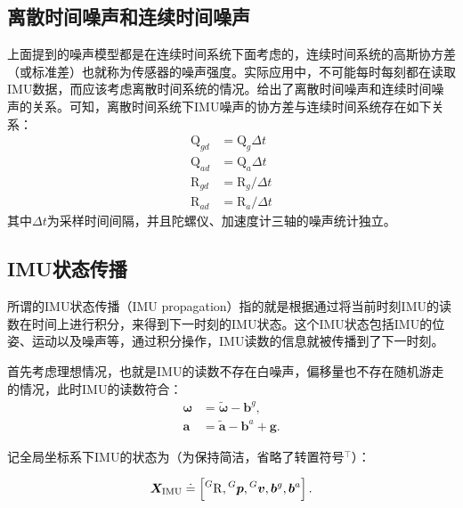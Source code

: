 \subsection{离散时间噪声和连续时间噪声}

上面提到的噪声模型都是在连续时间系统下面考虑的，连续时间系统的高斯协方差（或标准差）也就称为传感器的噪声强度。实际应用中，不可能每时每刻都在读取IMU数据，而应该考虑离散时间系统的情况。给出了离散时间噪声和连续时间噪声的关系。可知，离散时间系统下IMU噪声的协方差与连续时间系统存在如下关系：
\begin{equation}
\begin{aligned}
    \mathrm{Q}_{gd} &= \mathrm{Q}_g \Delta t   \\
    \mathrm{Q}_{ad} &= \mathrm{Q}_a \Delta t   \\
    \mathrm{R}_{gd} &= \mathrm{R}_g / \Delta t \\
    \mathrm{R}_{ad} &= \mathrm{R}_a / \Delta t
\end{aligned}
\end{equation}
其中$\Delta t$为采样时间间隔，并且陀螺仪、加速度计三轴的噪声统计独立。

\subsection{IMU状态传播}

所谓的IMU状态传播（IMU propagation）指的就是根据通过将当前时刻IMU的读数在时间上进行积分，来得到下一时刻的IMU状态。这个IMU状态包括IMU的位姿、运动以及噪声等，通过积分操作，IMU读数的信息就被传播到了下一时刻。

首先考虑理想情况，也就是IMU的读数不存在白噪声，偏移量也不存在随机游走的情况，此时IMU的读数符合：
\begin{equation}
\begin{aligned}
    \bm{\omega}  &= \tilde{\bm{\omega}} - \bm{b}^g, \\
    \bm{a} &= \tilde{\bm a} - \bm{b}^a + \bm{g}.
\end{aligned}
\end{equation}

记全局坐标系下IMU的状态为（为保持简洁，省略了转置符号${}^\top$）：

\begin{equation}
  \bm{X}_{\textrm{IMU}} \doteq
  \left[
      \prescript{G}{}{\mathrm R},
      \prescript{G}{}{\bm p},
      \prescript{G}{}{\bm v},
      \bm{b}^g, \bm{b}^a
  \right].
\end{equation}

